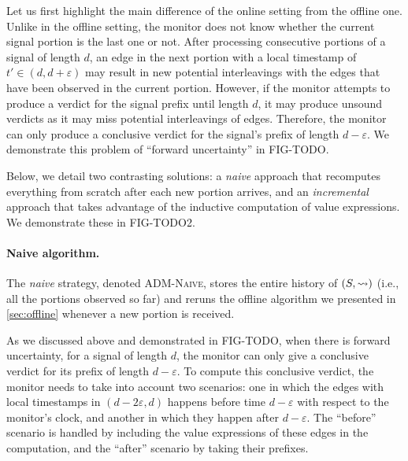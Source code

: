 Let us first highlight the main difference of the online setting from the offline one.
Unlike in the offline setting, the monitor does not know whether the current signal portion is the last one or not.
After processing consecutive portions of a signal of length $d$, an edge in the next portion with a local timestamp of $t' \in (d, d+\varepsilon)$ may result in new potential interleavings with the edges that have been observed in the current portion.
However, if the monitor attempts to produce a verdict for the signal prefix until length $d$, it may produce unsound verdicts as it may miss potential interleavings of edges.
Therefore, the monitor can only produce a conclusive verdict for the signal's prefix of length $d-\varepsilon$.
We demonstrate this problem of ``forward uncertainty'' in FIG-TODO.

Below, we detail two contrasting solutions: a \emph{naive} approach that recomputes everything from scratch after each new portion arrives, and an \emph{incremental} approach that takes advantage of the inductive computation of value expressions.
We demonstrate these in FIG-TODO2.

\paragraph*{Naive algorithm.}
The \emph{naive} strategy, denoted \textsc{ADM-Naive}, stores the entire history of $(S,{\rightsquigarrow})$ (i.e., all the portions observed so far) and reruns the offline algorithm we presented in \cref{sec:offline} whenever a new portion is received.

As we discussed above and demonstrated in FIG-TODO, when there is forward uncertainty, for a signal of length $d$, the monitor can only give a conclusive verdict for its prefix of length $d-\varepsilon$.
To compute this conclusive verdict, the monitor needs to take into account two scenarios: one in which the edges with local timestamps in $(d-2\varepsilon, d)$ happens before time $d-\varepsilon$ with respect to the monitor's clock, and another in which they happen after $d-\varepsilon$.
The ``before'' scenario is handled by including the value expressions of these edges in the computation, and the ``after'' scenario by taking their prefixes.

